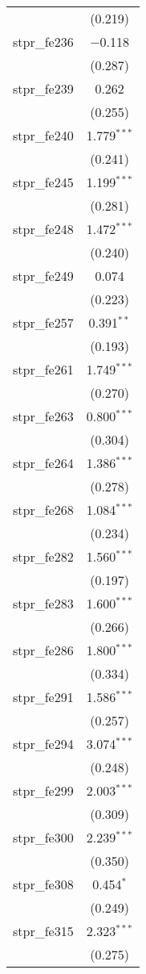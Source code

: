 \begin{table}[!htbp]
\begin{tabular}{@{\extracolsep{5pt}}lc}
  & (0.219) \\ 
  stpr\_fe236 & $-$0.118 \\ 
  & (0.287) \\ 
  stpr\_fe239 & 0.262 \\ 
  & (0.255) \\ 
  stpr\_fe240 & 1.779$^{***}$ \\ 
  & (0.241) \\ 
  stpr\_fe245 & 1.199$^{***}$ \\ 
  & (0.281) \\ 
  stpr\_fe248 & 1.472$^{***}$ \\ 
  & (0.240) \\ 
  stpr\_fe249 & 0.074 \\ 
  & (0.223) \\ 
  stpr\_fe257 & 0.391$^{**}$ \\ 
  & (0.193) \\ 
  stpr\_fe261 & 1.749$^{***}$ \\ 
  & (0.270) \\ 
  stpr\_fe263 & 0.800$^{***}$ \\ 
  & (0.304) \\ 
  stpr\_fe264 & 1.386$^{***}$ \\ 
  & (0.278) \\ 
  stpr\_fe268 & 1.084$^{***}$ \\ 
  & (0.234) \\ 
  stpr\_fe282 & 1.560$^{***}$ \\ 
  & (0.197) \\ 
  stpr\_fe283 & 1.600$^{***}$ \\ 
  & (0.266) \\ 
  stpr\_fe286 & 1.800$^{***}$ \\ 
  & (0.334) \\ 
  stpr\_fe291 & 1.586$^{***}$ \\ 
  & (0.257) \\ 
  stpr\_fe294 & 3.074$^{***}$ \\ 
  & (0.248) \\ 
  stpr\_fe299 & 2.003$^{***}$ \\ 
  & (0.309) \\ 
  stpr\_fe300 & 2.239$^{***}$ \\ 
  & (0.350) \\ 
  stpr\_fe308 & 0.454$^{*}$ \\ 
  & (0.249) \\ 
  stpr\_fe315 & 2.323$^{***}$ \\ 
  & (0.275) \\ 

\end{tabular}
\end{table}
